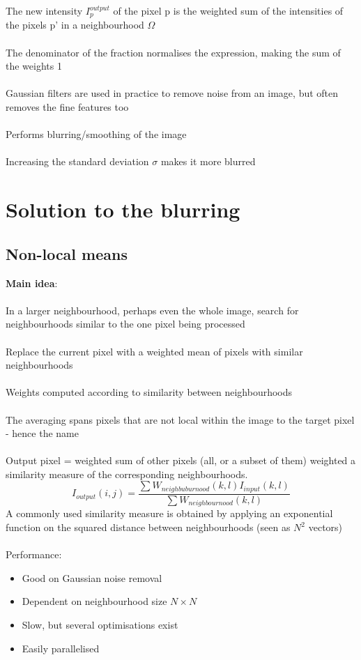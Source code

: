 \documentclass{article}[18pt]
\begin{document}
The new intensity $I_p^{output}$ of the pixel p is the weighted sum of the intensities of the pixels p' in a neighbourhood $\Omega$\\
\\
The denominator of the fraction normalises the expression, making the sum of the weights 1\\
\\
Gaussian filters are used in practice to remove noise from an image, but often removes the fine features too\\
\\
Performs blurring/smoothing of the image\\
\\
Increasing the standard deviation $\sigma$ makes it more blurred
\section{Solution to the blurring}
\subsection{Non-local means}
\textbf{Main idea}:\\
\\
In a larger neighbourhood, perhaps even the whole image, search for neighbourhoods similar to the one pixel being processed\\
\\
Replace the current pixel with a weighted mean of pixels with similar neighbourhoods\\
\\
Weights computed according to similarity between neighbourhoods\\
\\
The averaging spans pixels that are not local within the image to the target pixel - hence the name\\
\\
Output pixel = weighted sum of other pixels (all, or a subset of them) weighted a similarity measure of the corresponding neighbourhoods.
\[
I_{o u t p u t}(i, j)=\frac{\sum W_{n e i g h b u b u r n o o d}(k, l) I_{i n p u t}(k, l)}{\sum W_{n e i g h b o u r n o o d}(k, l)}
\]
A commonly used similarity measure is obtained by applying an exponential function on the squared distance between neighbourhoods (seen as $N^2$ vectors)\\
\\
Performance:
\begin{itemize}
	\item Good on Gaussian noise removal
	\item Dependent on neighbourhood size $N\times N$
	\item Slow, but several optimisations exist
	\item Easily parallelised
\end{itemize}
\end{document}
